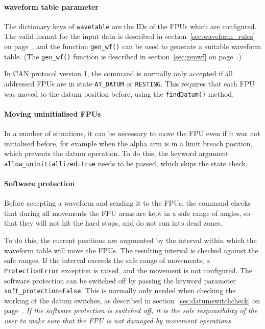 \documentclass[11pt,a4paper]{report}
\begin{document}
\paragraph{waveform table parameter}

The dictionary keys of \texttt{wavetable} are the IDs of the FPUs
which are configured. The valid format for the input data is described
in section~\ref{sec:waveform_rules} on
page~\pageref{sec:waveform_rules}, and the function \texttt{gen\_wf()}
can be used to generate a suitable waveform table. (The
\texttt{gen\_wf()} function is described in section~\ref{sec:genwf} on
page~\pageref{sec:genwf}.)

In CAN protocol version 1, the command is normally only accepted if
all addressed FPUs are in state \texttt{AT\_DATUM} or \texttt{RESTING}.
This requires that each FPU was moved to the datum position before, using
the \texttt{findDatum()} method.

\paragraph{Moving uninitialised FPUs}

In a number of situations, it can be necessary to move the FPU even if
it was not initialised before, for example when the alpha arm is in a
limit breach position, which prevents the datum operation. To do this,
the keyword argument \texttt{allow\_uninitiallized=True} needs to be passed,
which skips the state check.

\paragraph{Software protection}
 Before accepting a waveform and sending it
to the FPUs, the command checks that during all movements the FPU arms
are kept in a safe range of angles, so that they will not hit the hard
stops, and do not run into dead zones.

To do this, the current positions are augmented by the interval within
which the waveform table will move the FPUs. The resulting interval is
checked against the safe ranges. If the interval exceeds the safe
range of movements, a \texttt{ProtectionError} exception is raised,
and the movement is not configured.  The software protection can be
switched off by passing the keyword parameter
\texttt{soft\_protection=False}. This is normally only needed when
checking the working of the datum switches, as described in
section~\ref{sec:datumswitchcheck} on
page~\pageref{sec:datumswitchcheck}. \emph{If the software protection
  is switched off, it is the sole responsibility of the user to make
  sure that the FPU is not damaged by movement operations.}
\end{document}
